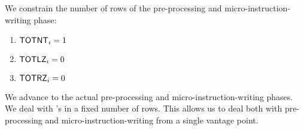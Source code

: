 \begin{center}
\end{center}
We constrain the number of rows of the pre-processing and micro-instruction-writing phase:
\begin{enumerate}
	\item $\textsf{TOTNT}_{i} = 1$
	\item $\textsf{TOTLZ}_{i} = 0$
	\item $\textsf{TOTRZ}_{i} = 0$
\end{enumerate}
We advance to the actual pre-processing and micro-instruction-writing phases.
We deal with \mmuInstInvalidCodePrefix{}'s in a fixed number of rows.
This allows us to deal both with pre-processing and micro-instruction-writing from a single vantage point. 
